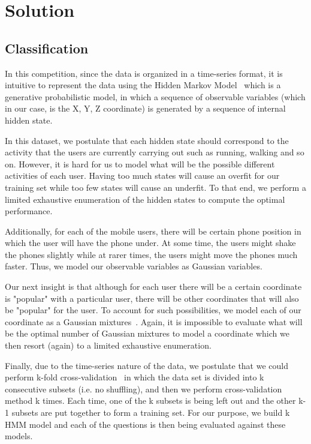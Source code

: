 \section{Solution}

\subsection{Classification}
In this competition, since the data is organized in a time-series format, it is
intuitive to represent the data using the Hidden Markov Model~\cite{HMM1996}
which is a generative probabilistic model, in which a sequence of observable
variables (which in our case, is the X, Y, Z coordinate) is generated by a
sequence of internal hidden state.

In this dataset, we postulate that each hidden state should correspond to the
activity that the users are currently carrying out such as running, walking and
so on. However, it is hard for us to model what will be the possible different
activities of each user. Having too much states will cause an overfit for our
training set while too few states will cause an underfit. To that end, we
perform a limited exhaustive enumeration of the hidden states to compute the
optimal performance.

Additionally, for each of the mobile users, there will be certain phone
position in which the user will have the phone under. At some time, the users
might shake the phones slightly while at rarer times, the users might move the
phones much faster. Thus, we model our observable variables as Gaussian
variables.

Our next insight is that although for each user there will be a certain
coordinate is "popular" with a particular user, there will be other coordinates
that will also be "popular" for the user. To account for such possibilities, we
model each of our coordinate as a Gaussian mixtures~\cite{GMM2009}. Again, it
is impossible to evaluate what will be the optimal number of Gaussian mixtures
to model a coordinate which we then resort (again) to a limited exhaustive
enumeration.

Finally, due to the time-series nature of the data, we postulate that we could
perform k-fold cross-validation~\cite{KFold2013} in which the data set is
divided into k consecutive subsets (i.e. no shuffling), and then we perform
cross-validation method k times. Each time, one of the k subsets is being left
out and the other k-1 subsets are put together to form a training set. For our
purpose, we build k HMM model and each of the questions is then being evaluated
against these models.

